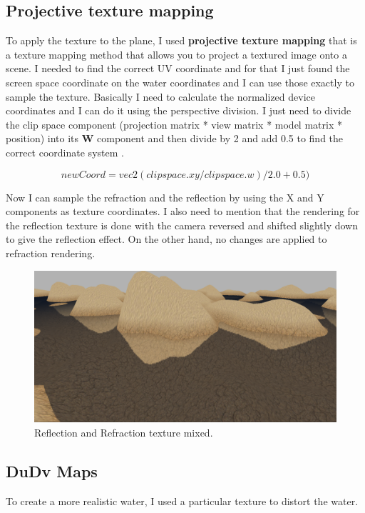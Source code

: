 \subsection{Projective texture mapping}
To apply the texture to the plane, I used \textbf{projective texture mapping} that is a texture mapping method that allows you to project a textured image onto a scene. I needed to find the correct UV coordinate and for that I just found the screen space coordinate on the water coordinates and I can use those exactly to sample the texture. Basically I need to calculate the normalized device coordinates and I can do it using the perspective division. I just need to divide the clip space component (projection matrix * view matrix * model matrix * position) into its \textbf{W} component and then divide by 2 and add 0.5 to find the correct coordinate system .

\begin{equation}
newCoord = vec2(clipspace.xy / clipspace.w) / 2.0 + 0.5)		
\end{equation}

\noindent
Now I can sample the refraction and the reflection by using the X and Y components as texture coordinates.
I also need to mention that the rendering for the reflection texture is done with the camera reversed and shifted slightly down to give the reflection effect. On the other hand, no changes are applied to refraction rendering.

\newpage

\begin{figure}[hbt!]
	\centering
	\includegraphics[width= 1
	\textwidth]{images/Water3.png}
	\caption{Reflection and Refraction texture mixed.}
\end{figure} 

\subsection{DuDv Maps}
To create a more realistic water, I used a particular texture to distort the water.

